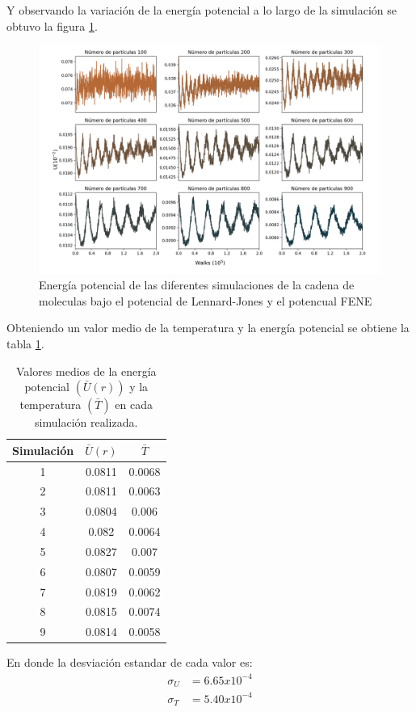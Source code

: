 Y observando la variación de la energía potencial a lo largo de la simulación se obtuvo la figura \ref{fig:energy}.
\begin{figure}[H]
    \includegraphics[scale=0.25]{../Graphics/energy.png}
    \caption{Energía potencial de las diferentes simulaciones de la cadena de moleculas bajo el potencial de Lennard-Jones y el potencual FENE}
    \label{fig:energy}
\end{figure}
Obteniendo un valor medio de la temperatura y la energía potencial se obtiene la tabla \ref{table:mean}.
\begin{table}[H]
    \centering
    \begin{tabular}{ccc} \hline
        Simulación & $\bar{U}(r)$ & $\bar{T}$ \\ \hline
        1&0.0811&0.0068\\
        2&0.0811&0.0063\\
        3&0.0804&0.006\\
        4&0.082&0.0064\\
        5&0.0827&0.007\\
        6&0.0807&0.0059\\
        7&0.0819&0.0062\\
        8&0.0815&0.0074\\
        9&0.0814&0.0058\\ \hline
    \end{tabular}
    \caption{Valores medios de la energía potencial $(\bar{U}(r))$ y la temperatura $(\bar{T})$ en cada simulación realizada.}
    \label{table:mean}
\end{table}
En donde la desviación estandar de cada valor es:
\begin{align*}
    \sigma_{U} &= 6.65x10^{-4} \\
    \sigma_{T} &= 5.40x10^{-4}\\
\end{align*}